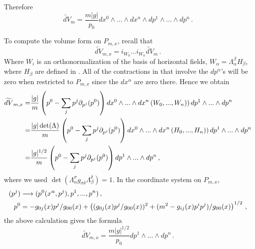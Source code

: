 Therefore
\begin{equation}
\widetilde{dV}_m=\frac{m|g|}{p_0}dx^0\wedge...\wedge dx^n\wedge dp^1\wedge...\wedge dp^n\,.
\end{equation}

To compute the volume form on $P_{m,x}$, recall  that 
\begin{equation}\label{contract_horiz}
\widetilde{dV}_{m,x}=i_{W_0}...i_{W_n}\widetilde{dV}_m\,.
\end{equation}
Where $W_i$ is an orthonormalization of the basis of horizontal fields, $W_\alpha=\Lambda^\beta_\alpha H_\beta$, where $H_\beta$ are defined in . All of the contractions in  that involve the $dp^\alpha$'s will be zero when restricted to $P_{m,x}$ since the $dx^\alpha$ are zero there. Hence we obtain
\begin{align}\label{dV_x}
\widetilde{dV}_{m,x}=&\frac{|g|}{m}\left(p^0-\sum_{j}p^j \partial_{p^j}(p^0) \right)dx^0\wedge...\wedge dx^n\left(W_0,...,W_n)\right) dp^1\wedge...\wedge dp^n\\
=&\frac{|g|\det(\Lambda)}{m}\left(p^0-\sum_{j}p^j \partial_{p^j}(p^0) \right)dx^0\wedge...\wedge dx^n\left(H_0,...,H_n)\right) dp^1\wedge...\wedge dp^n\notag\\
=&\frac{|g|^{1/2}}{m}\left(p^0-\sum_{j}p^j \partial_{p^j}(p^0) \right) dp^1\wedge...\wedge dp^n\,,\notag
\end{align}
where we used $\det(\Lambda^\sigma_\alpha g_{\sigma\delta}\Lambda^\delta_\beta)=1$.
 In the coordinate system on $P_{m,x}$,
\begin{align}
(p^j)&\longrightarrow (p^0(x^\alpha,p^j),p^1,...,p^n)\,,\\
 p^0&=-g_{0j}(x)p^j/g_{00}(x)+\left((g_{0j}(x)p^j/g_{00}(x))^2+(m^2-g_{ij}(x)p^ip^j)/g_{00}(x)\right)^{1/2}\,,\notag
\end{align}
the above calculation   gives the formula
\begin{equation}
\widetilde{dV}_{m,x}=\frac{m|g|^{1/2}}{p_0}dp^1\wedge...\wedge dp^n\,.
\end{equation}



